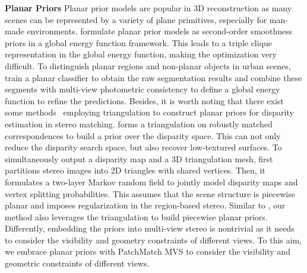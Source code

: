 \documentclass[letterpaper]{article} %
\begin{document}
\noindent\textbf{Planar Priors} Planar prior models are popular in 3D reconstruction as many scenes can be represented by a variety of plane primitives, especially for man-made environments. \cite{Gennert1988Brightness,Woodford2009Global} formulate planar prior models as second-order smoothness priors in a global energy function framework. This leads to a triple clique representation in the global energy function, making the optimization very difficult. To distinguish planar regions and non-planar objects in urban scenes, \cite{Gallup2010Piecewise} train a planar classifier to obtain the raw segmentation results and combine these segments with multi-view photometric consistency to define a global energy function to refine the predictions. Besides, it is worth noting that there exist some methods~\cite{Geiger2010Efficient,Zhang2015MeshStereo} employing triangulation to construct planar priors for disparity estimation in stereo matching. \cite{Geiger2010Efficient} forms a triangulation on robustly matched correspondences to build a prior over the disparity space. This can not only reduce the disparity search space, but also recover low-textured surfaces. To simultaneously output a disparity map and a 3D triangulation mesh, \cite{Zhang2015MeshStereo} first partitions stereo images into 2D triangles with shared vertices. Then, it formulates a two-layer Markov random field to jointly model disparity maps and vertex splitting probabilities. This assumes that the scene structure is piecewise planar and imposes regularization in the region-based stereo. Similar to \cite{Geiger2010Efficient}, our method also leverages the triangulation to build piecewise planar priors. Differently, embedding the priors into multi-view stereo is nontrivial as it needs to consider the visibility and geometry constraints of different views. To this aim, we embrace planar priors with PatchMatch MVS to consider the visibility and geometric constraints of different views.
\end{document}
